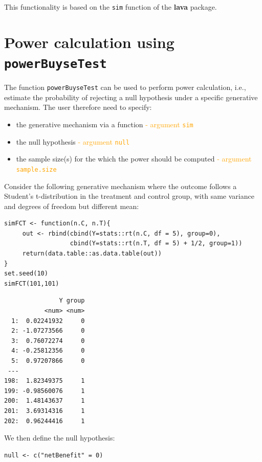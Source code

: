 \documentclass[12pt]{article}
\begin{document}
This functionality is based on the \texttt{sim} function of the \textbf{lava}
package.

\clearpage

\section{Power calculation using \texttt{powerBuyseTest}}
\label{sec:orgc2909ab}

The function \texttt{powerBuyseTest} can be used to perform power
calculation, i.e., estimate the probability of rejecting a null
hypothesis under a specific generative mechanism. The user therefore
need to specify:
\begin{itemize}
\item the generative mechanism via a function \hfill \textcolor{orange}{- argument \texttt{sim}}
\item the null hypothesis \hfill \textcolor{orange}{- argument \texttt{null}}
\item the sample size(s) for the which the power should be computed  \hfill \textcolor{orange}{- argument \texttt{sample.size}}
\end{itemize}

\bigskip

Consider the following generative mechanism where the outcome follows
a Student's t-distribution in the treatment and control group, with same
variance and degrees of freedom but different mean:
\lstset{language=r,label= ,caption= ,captionpos=b,numbers=none}
\begin{lstlisting}
simFCT <- function(n.C, n.T){
     out <- rbind(cbind(Y=stats::rt(n.C, df = 5), group=0),
                  cbind(Y=stats::rt(n.T, df = 5) + 1/2, group=1))
     return(data.table::as.data.table(out))
}
set.seed(10)
simFCT(101,101)
\end{lstlisting}

\begin{verbatim}
               Y group
           <num> <num>
  1:  0.02241932     0
  2: -1.07273566     0
  3:  0.76072274     0
  4: -0.25812356     0
  5:  0.97207866     0
 ---                  
198:  1.82349375     1
199: -0.98560076     1
200:  1.48143637     1
201:  3.69314316     1
202:  0.96244416     1
\end{verbatim}

We then define the null hypothesis:
\lstset{language=r,label= ,caption= ,captionpos=b,numbers=none}
\begin{lstlisting}
null <- c("netBenefit" = 0)
\end{lstlisting}
\end{document}
